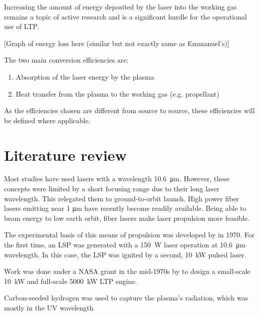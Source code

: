 
        Increasing the amount of energy deposited by the laser into the working gas remains a topic of active research and is a significant hurdle for the operational use of LTP.

            [Graph of energy loss here (similar but not exactly same as Emmanuel's)]

            The two main conversion efficiencies are:
            \begin{enumerate}
                \item Absorption of the laser energy by the plasma
                \item Heat transfer from the plasma to the working gas (e.g. propellant)
            \end{enumerate}

        As the efficiencies chosen are different from source to source, these efficiencies will be defined where applicable.
    
    \section{Literature review}
    
        Most studies have used  lasers with a wavelength \qty{10.6}{μm}. However, these concepts were limited by a short focusing range due to their long laser wavelength. This relegated them to ground-to-orbit launch. High power fiber lasers emitting near 1 μm have recently become readily available. Being able to beam energy to low earth orbit, fiber lasers make laser propulsion more feasible.


        The experimental basis of this means of propulsion was developed by \textcite{generalovContinuousOpticalDischarge1970} in 1970. For the first time, an LSP was generated with a \qty{150}{W}  laser operation at \qty{10.6}{μm} wavelength. In this case, the LSP was ignited by a second, \qty{10}{kW} pulsed  laser.
        

        Work was done under a NASA grant in the mid-1970s by \textcite{shojiLaserheatedRocketThruster1977,shojiPerformanceHeatTransfer1976a} to design a small-scale \qty{10}{kW} and full-scale \qty{5000}{kW} LTP engine. 
        
        Carbon-seeded hydrogen was used to capture the plasma's radiation, which was mostly in the UV wavelength 

